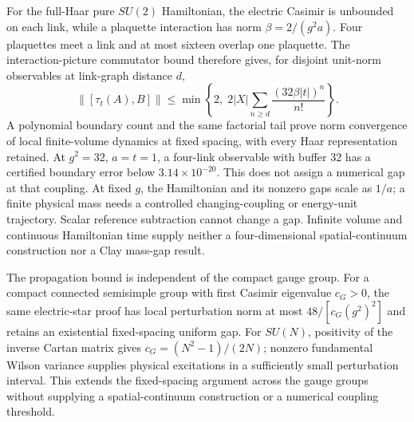 For the full-Haar pure $SU(2)$ Hamiltonian, the electric Casimir is unbounded
on each link, while a plaquette interaction has norm $\beta=2/(g^2a)$.
Four plaquettes meet a link and at most sixteen overlap one plaquette.
The interaction-picture commutator bound therefore gives, for disjoint
unit-norm observables at link-graph distance $d$,
\[
 \|[\tau_t(A),B]\|\leq
 \min\left\{2,\;2|X|\sum_{n\geq d}
                  \frac{(32\beta|t|)^n}{n!}\right\}.
\]
A polynomial boundary count and the same factorial tail prove norm
convergence of local finite-volume dynamics at fixed spacing, with every
Haar representation retained. At $g^2=32$, $a=t=1$, a four-link observable
with buffer $32$ has a certified boundary error below $3.14\times10^{-20}$.
This does not assign a numerical gap at that coupling. At fixed $g$, the
Hamiltonian and its nonzero gaps scale as $1/a$; a finite physical mass needs
a controlled changing-coupling or energy-unit trajectory. Scalar reference
subtraction cannot change a gap. Infinite volume and continuous Hamiltonian
time supply neither a four-dimensional spatial-continuum construction nor
a Clay mass-gap result.

The propagation bound is independent of the compact gauge group. For a
compact connected semisimple group with first Casimir eigenvalue $c_G>0$,
the same electric-star proof has local perturbation norm at most
$48/[c_G(g^2)^2]$ and retains an existential fixed-spacing uniform gap.
For $SU(N)$, positivity of the inverse Cartan matrix gives
$c_G=(N^2-1)/(2N)$; nonzero fundamental Wilson variance supplies physical
excitations in a sufficiently small perturbation interval. This extends the
fixed-spacing argument across the gauge groups without supplying a
spatial-continuum construction or a numerical coupling threshold.
